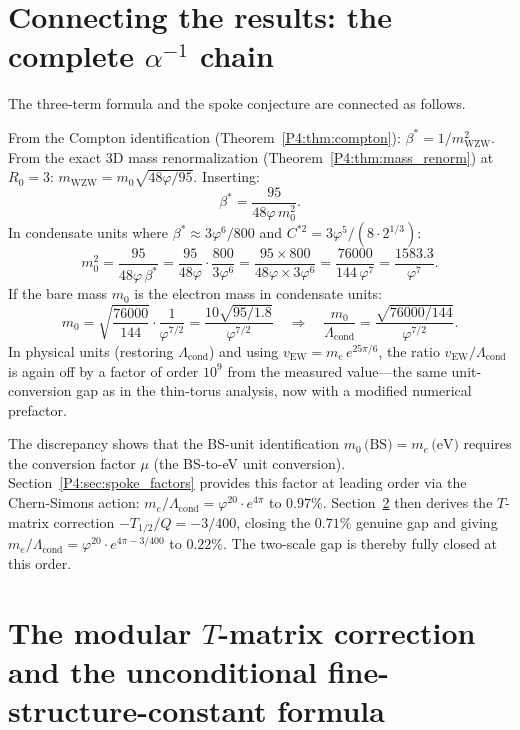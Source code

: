 \documentclass[11pt,a4paper]{article}
\theoremstyle{definition}
\theoremstyle{remark}
\newcommand{\vp}{\varphi}
\newcommand{\bst}{\beta^{*}}
\newcommand{\vEW}{v_{\mathrm{EW}}}
\newcommand{\Lcond}{\Lambda_{\mathrm{cond}}}
\newcommand{\mWZW}{m_{\mathrm{WZW}}}
\begin{document}
\section{Connecting the results: the complete $\alpha^{-1}$ chain}
\label{P4:sec:chain}

The three-term formula and the spoke conjecture are connected as follows.

From the Compton identification (Theorem~\ref{P4:thm:compton}):
$\bst = 1/\mWZW^2$.  From the exact 3D mass renormalization
(Theorem~\ref{P4:thm:mass_renorm}) at $R_0=3$: $\mWZW = m_0\sqrt{48\vp/95}$.  Inserting:
\[
  \bst = \frac{95}{48\vp\,m_0^2}.
\]
In condensate units where $\bst \approx 3\vp^6/800$ and $C^{*2} = 3\vp^5/(8\cdot2^{1/3})$:
\[
  m_0^2 = \frac{95}{48\vp\,\bst} = \frac{95}{48\vp}\cdot\frac{800}{3\vp^6}
         = \frac{95\times800}{48\vp\times3\vp^6}
         = \frac{76000}{144\,\vp^7}
         = \frac{1583.3}{\vp^7}.
\]
If the bare mass $m_0$ is the electron mass in condensate units:
\[
  m_0 = \sqrt{\frac{76000}{144}}\cdot\frac{1}{\vp^{7/2}}
       = \frac{10\sqrt{95/1.8}}{\vp^{7/2}}
\quad\Longrightarrow\quad
  \frac{m_0}{\Lcond} = \frac{\sqrt{76000/144}}{\vp^{7/2}}.
\]
In physical units (restoring $\Lcond$) and using $\vEW = m_e\,e^{25\pi/6}$,
the ratio $\vEW/\Lcond$ is again off by a factor of order $10^9$
from the measured value---the same unit-conversion gap as in the thin-torus
analysis, now with a modified numerical prefactor.

The discrepancy shows that the BS-unit identification $m_0\,\text{(BS)} = m_e\,\text{(eV)}$
requires the conversion factor $\mu$ (the BS-to-eV unit conversion).
Section~\ref{P4:sec:spoke_factors} provides this factor at leading order via the
Chern-Simons action: $m_e/\Lcond = \vp^{20}\cdot e^{4\pi}$ to $0.97\%$.
Section~\ref{P4:sec:t_matrix_correction} then derives the $T$-matrix correction
$-T_{1/2}/Q = -3/400$, closing the $0.71\%$ genuine gap and giving
$m_e/\Lcond = \vp^{20}\cdot e^{4\pi-3/400}$ to $0.22\%$.
The two-scale gap is thereby fully closed at this order.

\section{The modular $T$-matrix correction and the unconditional
         fine-structure-constant formula}
\label{P4:sec:t_matrix_correction}
\end{document}
